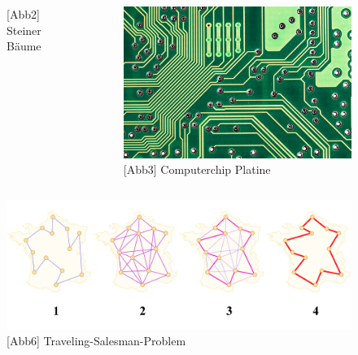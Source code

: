 \begin{frame}
{\begin{columns}
\begin{figure}
								\caption{[Abb2] Steiner Bäume}
							\end{figure}
							\begin{figure}
								\includegraphics[scale=0.12]{pictures/computer-chip}
								\caption{[Abb3] Computerchip Platine}
							\end{figure}
						\end{columns}
				}

	{
					\begin{figure}
						\includegraphics[scale=0.3]{pictures/traveling-salesman-problem}
						\caption{[Abb6] Traveling-Salesman-Problem}
					\end{figure}
				}


\end{frame}
